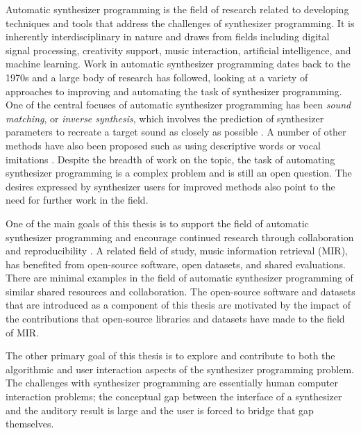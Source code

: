 Automatic synthesizer programming is the field of research related to developing techniques and tools that address the challenges of synthesizer programming. It is inherently interdisciplinary in nature and draws from fields including digital signal processing, creativity support, music interaction, artificial intelligence, and machine learning. Work in automatic synthesizer programming dates back to the 1970s \cite{justice1979analytic} and a large body of research has followed, looking at a variety of approaches to improving and automating the task of synthesizer programming. One of the central focuses of automatic synthesizer programming has been \textit{sound matching}, or \textit{inverse synthesis}, which involves the prediction of synthesizer parameters to recreate a target sound as closely as possible \cite{horner1993machine}. A number of other methods have also been proposed such as using descriptive words \cite{seago2013new} or vocal imitations \cite{cartwright2014synthassist}. Despite the breadth of work on the topic, the task of automating synthesizer programming is a complex problem and is still an open question. The desires expressed by synthesizer users for improved methods also point to the need for further work in the field.


One of the main goals of this thesis is to support the field of automatic synthesizer programming and encourage continued research through collaboration and reproducibility \cite{vandewalle2009reproducible}. A related field of study, music information retrieval (MIR), has benefited from open-source software, open datasets, and shared evaluations.
There are minimal examples in the field of automatic synthesizer programming of similar shared resources and collaboration. The open-source software and datasets that are introduced as a component of this thesis are motivated by the impact of the contributions that open-source libraries and datasets have made to the field of MIR.

The other primary goal of this thesis is to explore and contribute to both the algorithmic and user interaction aspects of the synthesizer programming problem. The challenges with synthesizer programming are essentially human computer interaction problems; the conceptual gap between the interface of a synthesizer and the auditory result is large and the user is forced to bridge that gap themselves. 

